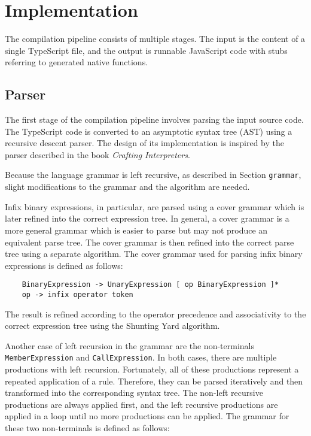 \chapter{Implementation}

The compilation pipeline consists of multiple stages. The input is the content of a single TypeScript file, and the output is runnable JavaScript code with stubs referring to generated native functions.


\section{Parser}

The first stage of the compilation pipeline involves parsing the input source code. The TypeScript code is converted to an asymptotic syntax tree (AST) using a recursive descent parser. The design of its implementation is inspired by the parser described in the book \textit{Crafting Interpreters}\cite{craftinginterpreters}.

Because the language grammar is left recursive, as described in Section \texttt{grammar}, slight modifications to the grammar and the algorithm are needed.

Infix binary expressions, in particular, are parsed using a cover grammar which is later refined into the correct expression tree. In general, a cover grammar is a more general grammar which is easier to parse but may not produce an equivalent parse tree. The cover grammar is then refined into the correct parse tree using a separate algorithm. The cover grammar used for parsing infix binary expressions is defined as follows:

\begin{verbatim}
    BinaryExpression -> UnaryExpression [ op BinaryExpression ]*
    op -> infix operator token
\end{verbatim}

The result is refined according to the operator precedence and associativity to the correct expression tree using the Shunting Yard algorithm\cite{algol60}.

Another case of left recursion in the grammar are the non-terminals \texttt{MemberExpression} and \texttt{CallExpression}. In both cases, there are multiple productions with left recursion. Fortunately, all of these productions represent a repeated application of a rule. Therefore, they can be parsed iteratively and then transformed into the corresponding syntax tree. The non-left recursive productions are always applied first, and the left recursive productions are applied in a loop until no more productions can be applied. The grammar for these two non-terminals is defined as follows:

